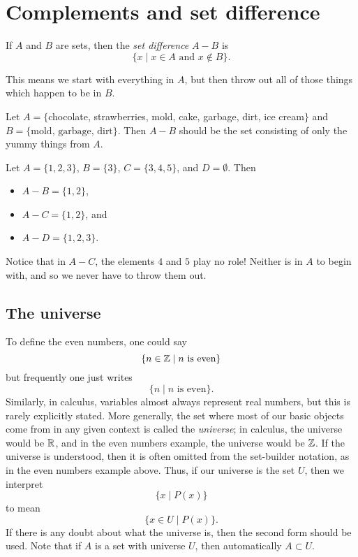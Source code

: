 \documentclass{tufte-book}
\begin{document}



\section{Complements and set difference}
\label{sec:compl-set-diff}

\begin{definition}
  If $A$ and $B$ are sets, then the \emph{set difference} $A - B$ is 
  \[
  \{x \mid x \in A \text{ and } x \notin B\}.
  \]
\end{definition}
This means we start with everything in $A$, but then throw out all of those things which happen to be in $B$.

\begin{example}
  Let $A = \{$chocolate, strawberries, mold, cake, garbage, dirt, ice cream$\}$ and $B = \{\text{mold, garbage, dirt}\}$. Then $A - B$ should be the set consisting of only the yummy things from $A$.
\end{example}

\begin{example}
  Let $A = \{1, 2, 3\}$, $B = \{3\}$, $C = \{3, 4, 5\}$, and $D = \emptyset$. Then
  \begin{itemize}
      \item $A - B = \{1, 2\}$,
      \item $A - C = \{1, 2\}$, and
      \item $A - D = \{1, 2, 3\}$.
  \end{itemize}
  Notice that in $A - C$, the elements $4$ and $5$ play no role! Neither is in $A$ to begin with, and so we never have to throw them out.
\end{example}

\subsection{The universe}
\label{sec:universe}

To define the even numbers, one could say
\[
\{n \in \mathbb{Z}  \mid  n \text{ is even}\}
\]
but frequently one just writes
\[
\{n  \mid  n \text{ is even}\}.
\]
Similarly, in calculus, variables almost always represent real numbers, but this is rarely explicitly stated. More generally, the set where most of our basic objects come from in any given context is called the \emph{universe}; in calculus, the universe would be $\mathbb{R}$, and in the even numbers example, the universe would be $\mathbb{Z}$. If the universe is understood, then it is often omitted from the set-builder notation, as in the even numbers example above. Thus, if our universe is the set $U$, then we interpret
\[
\{x  \mid  P(x)\} 
\]
to mean
\[
\{x \in U  \mid  P(x)\}.
\]
If there is any doubt about what the universe is, then the second form should be used. Note that if $A$ is a set with universe $U$, then automatically $A \subset U$.
\end{document}
